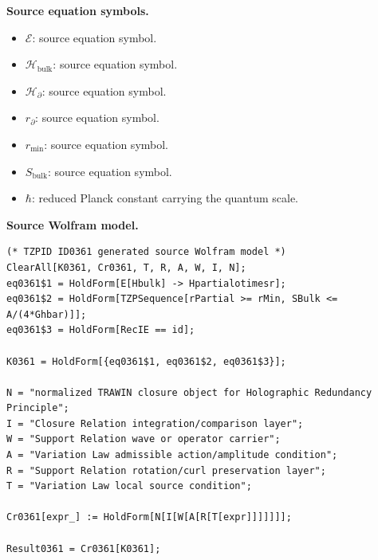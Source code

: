 \begin{minipage}[t]{0.49\linewidth}
\begingroup
\small
\raggedright
\textbf{Source equation symbols.}\par
\begin{itemize}[leftmargin=1.35em,itemsep=1pt,topsep=1pt,parsep=0pt]
    \item $\mathcal{E}$: source equation symbol.
    \item $\mathcal{H}_{\mathrm{bulk}}$: source equation symbol.
    \item $\mathcal{H}_{\partial}$: source equation symbol.
    \item $r_{\partial}$: source equation symbol.
    \item $r_{\min}$: source equation symbol.
    \item $S_{\mathrm{bulk}}$: source equation symbol.
    \item $\hbar$: reduced Planck constant carrying the quantum scale.
\end{itemize}
\endgroup
\end{minipage}\hfill
\begin{minipage}[t]{0.47\linewidth}
\begingroup
\scriptsize
\raggedright
\textbf{Source Wolfram model.}\par
\begin{Verbatim}[fontsize=\tiny,breaklines=true,breakanywhere=true]
(* TZPID ID0361 generated source Wolfram model *)
ClearAll[K0361, Cr0361, T, R, A, W, I, N];
eq0361$1 = HoldForm[E[Hbulk] -> Hpartialotimesr];
eq0361$2 = HoldForm[TZPSequence[rPartial >= rMin, SBulk <= A/(4*Ghbar)]];
eq0361$3 = HoldForm[RecIE == id];

K0361 = HoldForm[{eq0361$1, eq0361$2, eq0361$3}];

N = "normalized TRAWIN closure object for Holographic Redundancy Principle";
I = "Closure Relation integration/comparison layer";
W = "Support Relation wave or operator carrier";
A = "Variation Law admissible action/amplitude condition";
R = "Support Relation rotation/curl preservation layer";
T = "Variation Law local source condition";

Cr0361[expr_] := HoldForm[N[I[W[A[R[T[expr]]]]]]];

Result0361 = Cr0361[K0361];
\end{Verbatim}
\endgroup
\end{minipage}

